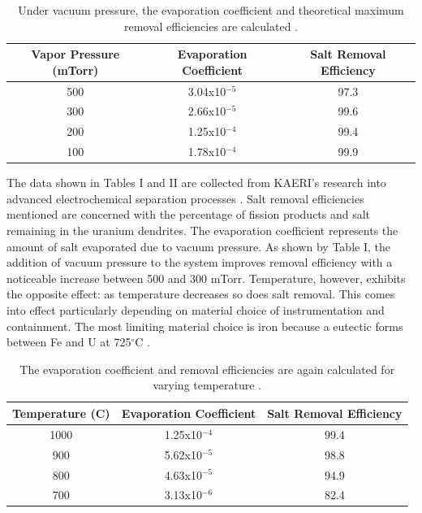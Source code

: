 \documentclass{anstrans}
\begin{document}
\begin{table}[h]
	\centering
	\begin{tabularx}{0.5\textwidth}{ccc}
		\hline
		\textbf{Vapor Pressure (mTorr)} & \textbf{Evaporation Coefficient} & \textbf{Salt Removal Efficiency} \\
		\hline
		500 & 3.04x10$^{-5}$ & 97.3 \\
		300 & 2.66x10$^{-5}$ & 99.6 \\
		200 & 1.25x10$^{-4}$ & 99.4 \\
		100 & 1.78x10$^{-4}$ & 99.9 \\
		\hline
	\end{tabularx}
	\caption {Under vacuum pressure, the evaporation coefficient and theoretical maximum removal efficiencies are calculated \cite{lee_advanced_nodate}.}
	\label {tab:pressure}
\end{table}

The data shown in Tables I and II are collected from KAERI's research into advanced electrochemical separation processes
\cite{lee_advanced_nodate}. Salt removal efficiencies mentioned are concerned with the percentage of fission products 
and salt remaining in the uranium dendrites. The evaporation coefficient represents the amount of salt evaporated due 
to vacuum pressure. As shown by Table I, the addition of vacuum pressure to the system improves removal efficiency 
with a noticeable increase between 500 and 300 mTorr. Temperature, however, exhibits the opposite effect: as temperature 
decreases so does salt removal. This comes into effect particularly depending on material choice of instrumentation and 
containment. The most limiting material choice is iron because a eutectic forms between Fe and U at 725$^{\circ}$C \cite{chapman_revision_1984}.

\begin{table}[h]
	\centering
	\begin{tabularx}{0.5\textwidth}{ccc}
		\hline
		\textbf{Temperature (C)} & \textbf{Evaporation Coefficient} & \textbf{Salt Removal Efficiency} \\
		\hline
		1000 & 1.25x10$^{-4}$ & 99.4 \\
		900 & 5.62x10$^{-5}$ & 98.8 \\
		800 & 4.63x10$^{-5}$ & 94.9 \\
		700 & 3.13x10$^{-6}$ & 82.4 \\
		\hline
	\end{tabularx}
	\caption {The evaporation coefficient and removal efficiencies are again calculated for varying temperature \cite{lee_advanced_nodate}.}
	\label {tab:temperature}
\end{table}
\end{document}
